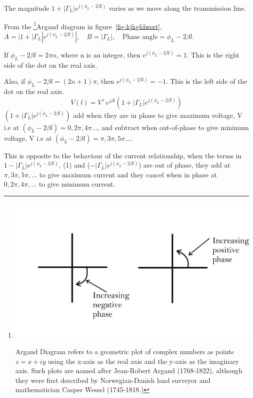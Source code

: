 The magnitude $1+|\Gamma_L|  e^{j(\phi_L -2 \beta l)}$ varies as we move along the transmission line.

From the \footnote{\includegraphics[scale=0.15]{./graphics/picture4}

Argand Diagram refers to a geometric plot of complex numbers as points $z = x + iy$ using the x-axis as the real axis and the y-axis as the imaginary axis. Such plots are named after Jean-Robert Argand (1768-1822), although they were first described by Norwegian-Danish land surveyor and mathematician Casper Wessel (1745-1818.)}Argand diagram in figure~\ref{fig:kjhgfdwert},
$ A =|1 +| \Gamma_L| e^{j (\phi_L - 2\beta l)}|,\quad B = |\Gamma_L|,\quad\text{Phase angle} = \phi_L - 2 \beta l$.

If $ \phi_L - 2 \beta l = 2 \pi n$, where n is an integer, then $ e^{j(\phi_L - 2 \beta l)} = 1$. This is the right side of the dot on the real axis.

Also, if $\phi_L - 2 \beta l=(2 n + 1) \pi$, then $e^{j (\phi_L - 2 \beta l)} = -1$. This is the left side of the dot on the real axis.
\begin{equation*}
V(l) = V^{+}e^{j\beta l}(1 + |\Gamma_L|  e^{j(\phi_L -2\beta l)})
\end{equation*}
$(1 + |\Gamma_L|  e^{j(\phi_L -2\beta l)})$ add when they are in phase to give maximum voltage, V i.e at $(\phi_L -2\beta l) = 0, 2\pi, 4\pi \ldots$, and subtract when out-of-phase to give minimum voltage, V i.e at  $(\phi_L -2\beta l) = \pi, 3\pi, 5\pi \ldots$.

This is opposite to the behaviour of the current relationship, when the terms in $1-|\Gamma_L|  e^{j(\phi_L -2\beta l)}$, (1) and  ($-|\Gamma_L|  e^{j(\phi_L -2\beta l)}$) are out of phase, they add at $\pi, 3\pi, 5\pi, \ldots$ to give maximum current and they cancel when in phase at $0, 2\pi, 4\pi, \ldots$ to give minimum current.

